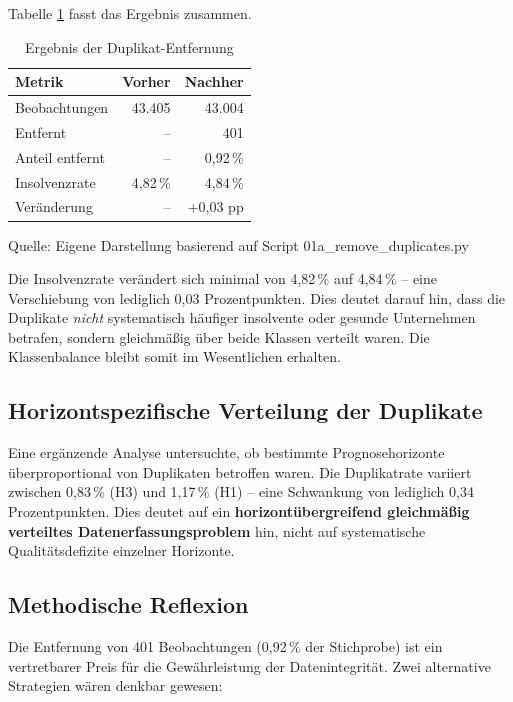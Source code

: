 Tabelle \ref{tab:duplikat_entfernung} fasst das Ergebnis zusammen.

\begin{table}[htbp]
\centering
\caption{Ergebnis der Duplikat-Entfernung}
\label{tab:duplikat_entfernung}
\begin{tabular}{lrr}
\toprule
\textbf{Metrik} & \textbf{Vorher} & \textbf{Nachher} \\
\midrule
Beobachtungen & 43.405 & 43.004 \\
Entfernt & -- & 401 \\
Anteil entfernt & -- & 0,92\,\% \\
\midrule
Insolvenzrate & 4,82\,\% & 4,84\,\% \\
Veränderung & -- & +0,03 pp \\
\bottomrule
\end{tabular}
\par\smallskip
{\footnotesize Quelle: Eigene Darstellung basierend auf Script 01a\_remove\_duplicates.py}
\end{table}

Die Insolvenzrate verändert sich minimal von 4,82\,\% auf 4,84\,\% – eine Verschiebung von lediglich 0,03 Prozentpunkten. Dies deutet darauf hin, dass die Duplikate \textit{nicht} systematisch häufiger insolvente oder gesunde Unternehmen betrafen, sondern gleichmäßig über beide Klassen verteilt waren. Die Klassenbalance bleibt somit im Wesentlichen erhalten.

\subsection{Horizontspezifische Verteilung der Duplikate}

Eine ergänzende Analyse untersuchte, ob bestimmte Prognosehorizonte überproportional von Duplikaten betroffen waren. Die Duplikatrate variiert zwischen 0,83\,\% (H3) und 1,17\,\% (H1) – eine Schwankung von lediglich 0,34 Prozentpunkten. Dies deutet auf ein \textbf{horizontübergreifend gleichmäßig verteiltes Datenerfassungsproblem} hin, nicht auf systematische Qualitätsdefizite einzelner Horizonte.

\subsection{Methodische Reflexion}

Die Entfernung von 401 Beobachtungen (0,92\,\% der Stichprobe) ist ein vertretbarer Preis für die Gewährleistung der Datenintegrität. Zwei alternative Strategien wären denkbar gewesen:

